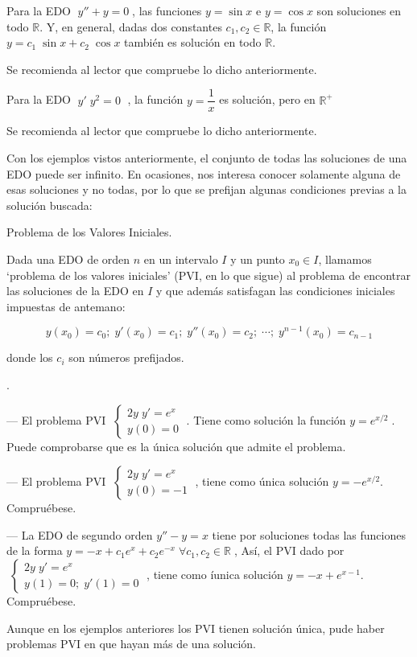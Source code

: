 \begin{ejem}
Para la EDO $\; y''+y=0\; $, las funciones $y=\sin x$ e $y=\cos x$ son soluciones en todo $\mathbb R$. Y, en general, dadas dos constantes $c_1, c_2 \in \mathbb R$, la función $y=c_1\; \sin x + c_2 \; \cos x$ también es solución en todo $\mathbb R$.

Se recomienda al lector que compruebe lo dicho anteriormente.
\end{ejem}

\begin{ejem}
Para la EDO $\; y'\; y^2=0 \;$	, la función $y=\dfrac 1 x$ es solución, pero en $\mathbb R^+$

Se recomienda al lector que compruebe lo dicho anteriormente.
\end{ejem}

Con los ejemplos vistos anteriormente, el conjunto de todas las soluciones de una EDO puede ser infinito. En ocasiones, nos interesa conocer solamente alguna de esas soluciones y no todas, por lo que se prefijan algunas condiciones previas a la solución buscada:

\begin{defi}{Problema de los Valores Iniciales.}

Dada una EDO de orden $n$ en un intervalo $I$ y un punto $x_0\in I$, llamamos `problema de los valores iniciales' (PVI, en lo que sigue) al problema de encontrar las soluciones de la EDO en $I$ y que además satisfagan las condiciones iniciales impuestas de antemano:

\begin{equation*}
	y(x_0)=c_0; \; y'(x_0)=c_1; \; y''(x_0)=c_2; \; \cdots ; \; y^{n-1}(x_0)=c_{n-1}
\end{equation*}

donde los $c_i$ son números prefijados.
\end{defi}

\begin{ejem}.

--- El problema PVI $\; \begin{cases} 2y\; y'=e^x \\ y(0)=0 \end{cases}\; $. Tiene como solución la función $y=e^{x/2}\; $. Puede comprobarse que es la única solución que admite el problema.

--- El problema PVI $\; \begin{cases} 2y\; y'=e^x \\ y(0)=-1 \end{cases}\; $, tiene como única solución $y=-e^{x/2}$. Compruébese.

--- La EDO de segundo orden $y''-y=x$ tiene por soluciones todas las funciones de la forma $y=-x+c_1 e^x+c_2 e^{-x} \; \forall c_1, c_2 \in \mathbb R \; $, Así, el PVI dado por $\; \begin{cases} 2y \; y'=e^x \\ y(1)=0; \; y'(1)=0 \end{cases}\; $, tiene como íunica solución $y=-x+e^{x-1}$. Compruébese.

Aunque en los ejemplos anteriores los PVI tienen solución única, pude haber problemas PVI en que hayan más de una solución.
\end{ejem}

